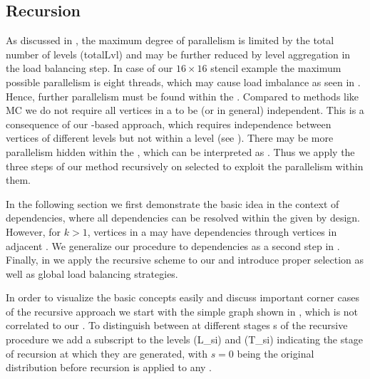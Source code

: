 	\subsection{Recursion}\label{subsec:REC}
As discussed in , the maximum degree of parallelism is limited
by the total number of levels (\acrshort{totalLvl}) and may be further reduced 
by level aggregation in the load balancing step. In case of our
$16\times16$ stencil example the maximum possible parallelism 
is eight threads, which may cause load imbalance as seen in 
.
Hence, %
further parallelism must be found within the \levelGroups.
Compared to methods like \acrshort{MC} 
we do not require all vertices in a \levelGroup to be \DONE (or \DK in general) 
independent. This is a consequence of our \level-based approach, which
requires \DK independence between vertices of different levels but not 
within a level (see ). There may be more parallelism hidden within 
the \levelGroups,  which can be interpreted as \subgraphs.  Thus we apply the three 
steps of our method recursively on selected \subgraphs to exploit the parallelism 
within them.  

In the following section we first demonstrate the basic
idea in the context of \DONE dependencies, where all dependencies can be resolved
within the given \levelGroup by design. However, for $k>1$, vertices in a
\levelGroup may have \DK dependencies through vertices in adjacent
\levelGroups. We generalize our procedure to \DK dependencies as a second step
in . Finally, in  we
apply the recursive scheme to our \stex and introduce proper \subgraph selection
as well as global load balancing strategies.

In order to visualize the basic concepts easily and discuss important corner
cases of the recursive approach we start with the simple graph shown in
, which is not correlated to our \stex. To distinguish
between \levelGroups at different stages \acrshort{s} of the recursive procedure
we add a subscript to the levels (\acrshort{L_si}) and \levelGroups
(\acrshort{T_si}) indicating the stage of recursion at which they are generated,
with $s=0$ being the original distribution before recursion is applied to any
\subgraph.

